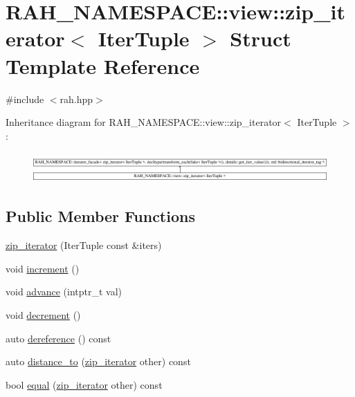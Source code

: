 \hypertarget{struct_r_a_h___n_a_m_e_s_p_a_c_e_1_1view_1_1zip__iterator}{}\section{R\+A\+H\+\_\+\+N\+A\+M\+E\+S\+P\+A\+CE\+::view\+::zip\+\_\+iterator$<$ Iter\+Tuple $>$ Struct Template Reference}
\label{struct_r_a_h___n_a_m_e_s_p_a_c_e_1_1view_1_1zip__iterator}


{\ttfamily \#include $<$rah.\+hpp$>$}

Inheritance diagram for R\+A\+H\+\_\+\+N\+A\+M\+E\+S\+P\+A\+CE\+::view\+::zip\+\_\+iterator$<$ Iter\+Tuple $>$\+:\begin{figure}[H]
\begin{center}
\leavevmode
\includegraphics[height=1.166667cm]{struct_r_a_h___n_a_m_e_s_p_a_c_e_1_1view_1_1zip__iterator}
\end{center}
\end{figure}
\subsection*{Public Member Functions}
\begin{DoxyCompactItemize}
\item 
\mbox{\hyperlink{struct_r_a_h___n_a_m_e_s_p_a_c_e_1_1view_1_1zip__iterator_a269ba1697b47bc931173852c52f95038}{zip\+\_\+iterator}} (Iter\+Tuple const \&iters)
\item 
void \mbox{\hyperlink{struct_r_a_h___n_a_m_e_s_p_a_c_e_1_1view_1_1zip__iterator_a8c0c1f446f53392f0ce0305671b42bab}{increment}} ()
\item 
void \mbox{\hyperlink{struct_r_a_h___n_a_m_e_s_p_a_c_e_1_1view_1_1zip__iterator_ac8304852464127fb0e170763f50da037}{advance}} (intptr\+\_\+t val)
\item 
void \mbox{\hyperlink{struct_r_a_h___n_a_m_e_s_p_a_c_e_1_1view_1_1zip__iterator_a27ebf75ef17d162183b3377414d9e091}{decrement}} ()
\item 
auto \mbox{\hyperlink{struct_r_a_h___n_a_m_e_s_p_a_c_e_1_1view_1_1zip__iterator_aaee77b971b67b773fd30954887327d92}{dereference}} () const
\item 
auto \mbox{\hyperlink{struct_r_a_h___n_a_m_e_s_p_a_c_e_1_1view_1_1zip__iterator_a28cd083a5e51f545237c1fb8f7945522}{distance\+\_\+to}} (\mbox{\hyperlink{struct_r_a_h___n_a_m_e_s_p_a_c_e_1_1view_1_1zip__iterator}{zip\+\_\+iterator}} other) const
\item 
bool \mbox{\hyperlink{struct_r_a_h___n_a_m_e_s_p_a_c_e_1_1view_1_1zip__iterator_ace4ecabc960b0b1a1ddb032e4f5a6668}{equal}} (\mbox{\hyperlink{struct_r_a_h___n_a_m_e_s_p_a_c_e_1_1view_1_1zip__iterator}{zip\+\_\+iterator}} other) const
\end{DoxyCompactItemize}
